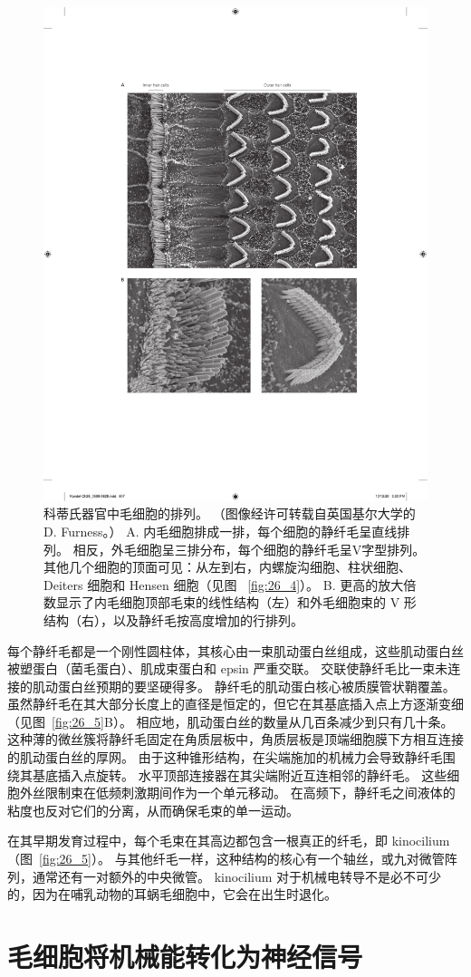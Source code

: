 \begin{figure}[htbp]
	\centering
	\includegraphics[width=0.5\linewidth]{chap26/fig_26_6}
	\caption{科蒂氏器官中毛细胞的排列。
		（图像经许可转载自英国基尔大学的 D. Furness。） 
		A. 内毛细胞排成一排，每个细胞的静纤毛呈直线排列。 
		相反，外毛细胞呈三排分布，每个细胞的静纤毛呈V字型排列。 
		其他几个细胞的顶面可见：从左到右，内螺旋沟细胞、柱状细胞、Deiters 细胞和 Hensen 细胞（见图 ~\ref{fig:26_4}）。
		B. 更高的放大倍数显示了内毛细胞顶部毛束的线性结构（左）和外毛细胞束的 V 形结构（右），以及静纤毛按高度增加的行排列。}
	\label{fig:26_6}
\end{figure}


每个静纤毛都是一个刚性圆柱体，其核心由一束肌动蛋白丝组成，这些肌动蛋白丝被塑蛋白（菌毛蛋白）、肌成束蛋白和 epsin 严重交联。
交联使静纤毛比一束未连接的肌动蛋白丝预期的要坚硬得多。
静纤毛的肌动蛋白核心被质膜管状鞘覆盖。
虽然静纤毛在其大部分长度上的直径是恒定的，但它在其基底插入点上方逐渐变细（见图~\ref{fig:26_5}B）。
相应地，肌动蛋白丝的数量从几百条减少到只有几十条。 
这种薄的微丝簇将静纤毛固定在角质层板中，角质层板是顶端细胞膜下方相互连接的肌动蛋白丝的厚网。
由于这种锥形结构，在尖端施加的机械力会导致静纤毛围绕其基底插入点旋转。
水平顶部连接器在其尖端附近互连相邻的静纤毛。
这些细胞外丝限制束在低频刺激期间作为一个单元移动。 
在高频下，静纤毛之间液体的粘度也反对它们的分离，从而确保毛束的单一运动。


在其早期发育过程中，每个毛束在其高边都包含一根真正的纤毛，即 kinocilium（图~\ref{fig:26_5}）。 
与其他纤毛一样，这种结构的核心有一个轴丝，或九对微管阵列，通常还有一对额外的中央微管。
kinocilium 对于机械电转导不是必不可少的，因为在哺乳动物的耳蜗毛细胞中，它会在出生时退化。



\section{毛细胞将机械能转化为神经信号}

